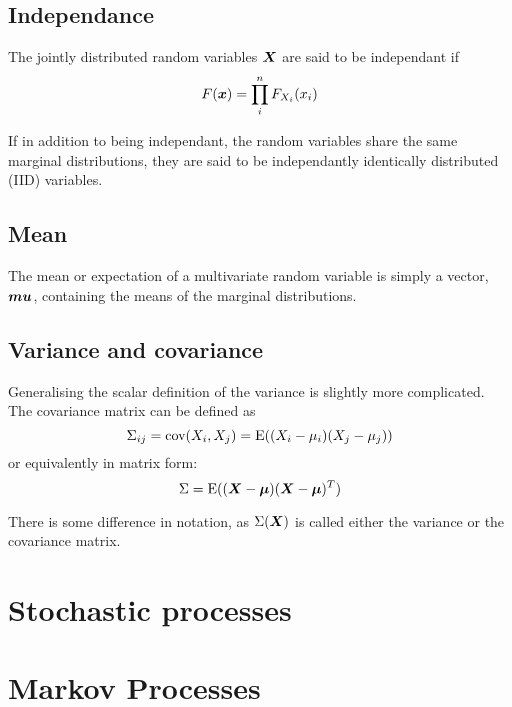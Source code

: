 \subsection{Independance}
The jointly distributed random variables $\boldsymbol{X}$ are said to be independant if 
\begin{equation}
  \label{eq:independance}
  F(\boldsymbol{x}) = \prod_i^n F_{X_i}(x_i)
\end{equation}

If in addition to being independant, the random variables share the same marginal distributions, they are said to be independantly identically distributed (IID) variables.

\subsection{Mean}
The mean or expectation of a multivariate random variable is simply a vector, $\boldsymbol{mu}$, containing the means of the marginal distributions.

\subsection{Variance and covariance}
Generalising the scalar definition of the variance is slightly more complicated.
The covariance matrix can be defined as 
\begin{equation}
  \label{eq:covariance}
  \Sigma_{ij} = \textrm{cov}(X_i, X_j) = \mathrm{E}((X_i-\mu_i)(X_j-\mu_j))
\end{equation}
or equivalently in matrix form:
\begin{equation}
  \label{eq:matrixcovariance}
  \Sigma = \mathrm{E}((\boldsymbol{X} - \boldsymbol{\mu})(\boldsymbol{X}-\boldsymbol{\mu})^T)
\end{equation}

There is some difference in notation, as $\Sigma(\boldsymbol{X})$ is called either the variance or the covariance matrix.

\section{Stochastic processes}
\label{sec:stochastic-processes}

\section{Markov Processes}

